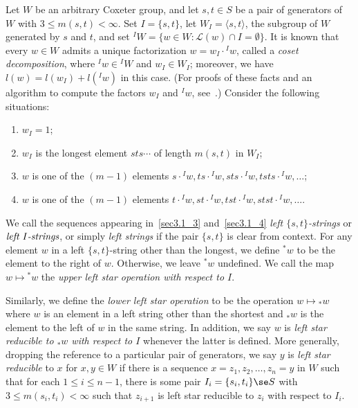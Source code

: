  Let $W$ be an arbitrary Coxeter group, and let $s,t\in S$ be a pair of
 generators of $W$ with $3\le m(s,t)<\infty$. Set $I=\{s,t\}$, let $W_I=\langle
 s,t\rangle$, the subgroup of $W$ generated by $s$ and $t$, and set ${}^I W=\{w\in
 W: \mathcal{L}(w)\cap I=\emptyset\}$. It is known that every $w\in W$ admits a unique
 factorization $w=w_I\cdot {}^I w$, called a \emph{coset decomposition}, where
 ${}^I w\in {}^I W$ and $w_I\in W_I$; moreover, we have $l(w)=l(w_I) +
 l({}^Iw)$ in this case. (For proofs
 of these facts and an algorithm to compute the factors $w_I$ and
 ${}^I w$, see~\cite[Proposition~2.4.4]{BB}.) Consider the following situations:
 \begin{enumerate}
 \item\label{sec3.1_1} $w_I=1$;
 \item\label{sec3.1_2} $w_I$ is the longest element $sts\cdots$ of length $m(s,t)$ in
 $W_I$;
 \item\label{sec3.1_3} $w$ is one of the $(m-1)$ elements $s\cdot {}^Iw, ts\cdot {}^Iw,
 sts\cdot {}^I
 w,tsts\cdot {}^I w,\ldots$;
 \item\label{sec3.1_4} $w$ is one of the $(m-1)$ elements $t\cdot {}^Iw, st\cdot {}^Iw,
 tst\cdot {}^I 
 w,stst\cdot {}^I w,\ldots$.
 \end{enumerate}
 We call the sequences appearing in~\eqref{sec3.1_3} and~\eqref{sec3.1_4} \emph{left
 $\{s,t\}$-strings} or $\emph{left $I$-strings}$, or simply
 \emph{left strings} if the pair $\{s,t\}$ is clear from context. For any element $w$ in a left
 $\{s,t\}$-string other than the longest, we define ${}^* w$ to be the
 element to the right of $w$. Otherwise, we leave ${}^* w$ undefined. We call
 the map $w\mapsto {}^* w$ the \emph{upper left star operation with respect
 to $I$}. 

 Similarly, we define the \emph{lower left
 star operation} to be the operation $w\mapsto {}_* w$ where $w$ is an element
 in a left string other than the shortest and ${}_* w$ is the element to the
 left of $w$ in the same string. In addition, we say $w$ is \emph{left star reducible to ${}_*
 w$ with respect to $I$} whenever the latter is defined. More generally,
 dropping the reference to a particular pair of generators, we
 say $y$ is \emph{left star reducible} to $x$ for $x,y\in W$ if there is a sequence
 $x=z_1,z_2,\ldots,z_n=y$ in $W$ such that for each $1\le i\le n-1$, there is
 some pair $I_i=\{s_i,t_i\}\se S$ with $3\le m(s_i,t_i)<\infty$ such that
 $z_{i+1}$ is left star reducible to $z_i$ with respect to $I_i$.



